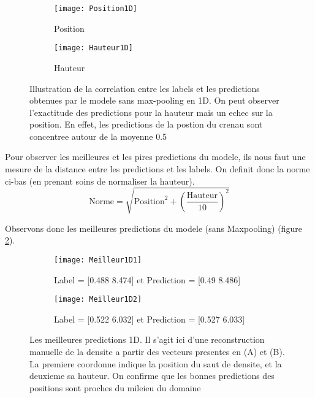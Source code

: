     \begin{figure}[!h]
    \begin{subfigure}{.5\textwidth}
    \centering
    \texttt{[image: Position1D]}  
    \caption[Pos1D]{Position}
    \end{subfigure}
    \begin{subfigure}{.5\textwidth}
    \centering
    \texttt{[image: Hauteur1D]}  
    \caption[H1D]{Hauteur}
    \end{subfigure}
    
     \centering
    \decoRule
    \caption[Illustration 1D]{Illustration de la correlation entre les labels et les predictions obtenues par le modele sans max-pooling en 1D. On peut observer l'exactitude des predictions pour la hauteur mais un echec sur la position. En effet, les predictions de la postion du crenau sont concentree autour de la moyenne 0.5}
    \label{fig:Illustration1D}
    \end{figure}

    Pour observer les meilleures et les pires predictions du modele, ils nous faut une mesure de la distance entre les predictions et les labels. On definit donc la norme ci-bas (en prenant soins de normaliser la hauteur). $$ \text{Norme} = \sqrt{\text{Position}^2 + \left( \frac{\text{Hauteur}}{10} \right)^2}$$
    
    Observons donc les meilleures predictions du modele (sans Maxpooling) (figure \ref{fig:Meilleur1D}).
    \begin{figure}[!h]
    \begin{subfigure}{.5\textwidth}
    \centering
    \texttt{[image: Meilleur1D1]}  
    \caption[Meilleur1D1]{Label = [0.488 8.474] et Prediction = [0.49  8.486]}
    \end{subfigure}
    \begin{subfigure}{.5\textwidth}
    \centering
    \texttt{[image: Meilleur1D2]}  
    \caption[Meilleur1D2]{Label = [0.522 6.032]  et Prediction = [0.527 6.033]}
    \end{subfigure}
    
     \centering
    \decoRule
    \caption[Meilleur 1D]{Les meilleures predictions 1D. Il s'agit ici d'une reconstruction manuelle de la densite a partir des vecteurs presentes en (A) et (B). La premiere coordonne indique la position du saut de densite, et la deuxieme sa hauteur. On confirme que les bonnes predictions des positions sont proches du mileieu du domaine}
    \label{fig:Meilleur1D}
    \end{figure}
    

